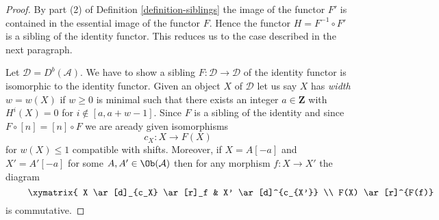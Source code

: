 \begin{proof}
By part (2) of Definition \ref{definition-siblings} the image of the functor
$F'$ is contained in the essential image of the functor $F$. Hence
the functor $H = F^{-1} \circ F'$ is a sibling of the identity functor.
This reduces us to the case described in the next paragraph.

\medskip\noindent
Let $\mathcal{D} = D^b(\mathcal{A})$. We have to show a sibling
$F : \mathcal{D} \to \mathcal{D}$ of the identity functor is
isomorphic to the identity functor. Given an object $X$ of $\mathcal{D}$
let us say $X$ has {\it width} $w = w(X)$ if $w \geq 0$ is minimal
such that there exists an integer $a \in \mathbf{Z}$ with $H^i(X) = 0$
for $i \not \in [a, a + w - 1]$. Since $F$ is a sibling of the identity
and since $F \circ [n] = [n] \circ F$ we are aready given isomorphisms
$$
c_X : X \to F(X)
$$
for $w(X) \leq 1$ compatible with shifts. Moreover, if $X = A[-a]$ and
$X' = A'[-a]$ for some $A, A' \in \Ob(\mathcal{A})$ then for any morphism
$f : X \to X'$ the diagram
\begin{equation}
\label{equation-to-show}
\vcenter{
\xymatrix{
X \ar[d]_{c_X} \ar[r]_f &
X' \ar[d]^{c_{X'}} \\
F(X) \ar[r]^{F(f)} &
F(X')
}
}
\end{equation}
is commutative.


\end{proof}
